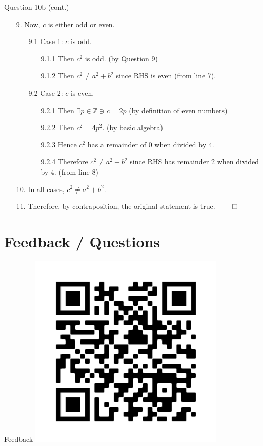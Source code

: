 \documentclass[10pt]{beamer}
\begin{document}
\begin{frame}[fragile]{Question 10b (cont.)}
\begin{enumerate}
    \item[9.] Now, $c$ is either odd or even.
    \begin{enumerate}
        \item[9.1] Case 1: $c$ is odd.
        \begin{enumerate}
            \item[9.1.1] Then $c^2$ is odd. (by Question 9)
            \item[9.1.2] Then $c^2 \neq a^2 + b^2$ since RHS is even (from line 7).
        \end{enumerate}
        \item[9.2] Case 2: $c$ is even.
        \begin{enumerate}
            \item[9.2.1] Then $\exists p \in \mathbb{Z} \ni c = 2p$ (by definition of even numbers)
            \item[9.2.2] Then $c^2 = 4p^2$. (by basic algebra)
            \item[9.2.3] Hence $c^2$ has a remainder of 0 when divided by 4.
            \item[9.2.4] Therefore $c^2 \neq a^2 + b^2$ since RHS has remainder 2 when divided by 4. (from line 8)
        \end{enumerate}
    \end{enumerate}
    \item[10.] In all cases, $c^2 \neq a^2 + b^2$.
    \item[11.] Therefore, by contraposition, the original statement is true. $\qed$
\end{enumerate}
\end{frame}

\section[Feedback / Questions]{Feedback / Questions}

\begin{frame}[fragile]{Feedback}
\centering
\includegraphics[width=0.7\textwidth]{frame(1).png}
\end{frame}



    
\end{document}
